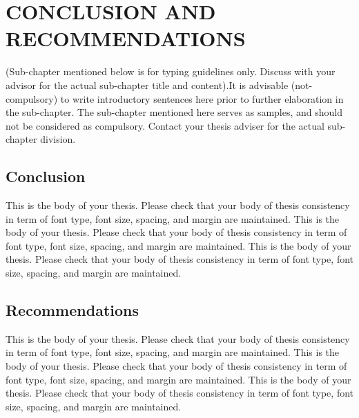 \chapter{CONCLUSION AND RECOMMENDATIONS}
(Sub-chapter mentioned below is for typing guidelines only. Discuss with your advisor for the actual sub-chapter title and content).It is advisable (not-compulsory) to write introductory sentences here prior to further elaboration in the sub-chapter. The sub-chapter mentioned here serves as samples, and should not be considered as compulsory. Contact your thesis adviser for the actual sub-chapter division.

\section{Conclusion}
This is the body of your thesis. Please check that your body of thesis consistency in term of font type, font size, spacing, and margin are maintained. This is the body of your thesis. Please check that your body of thesis consistency in term of font type, font size, spacing, and margin are maintained. This is the body of your thesis. Please check that your body of thesis consistency in term of font type, font size, spacing, and margin are maintained.

\section{Recommendations}
This is the body of your thesis. Please check that your body of thesis consistency in term of font type, font size, spacing, and margin are maintained. This is the body of your thesis. Please check that your body of thesis consistency in term of font type, font size, spacing, and margin are maintained. This is the body of your thesis. Please check that your body of thesis consistency in term of font type, font size, spacing, and margin are maintained.
